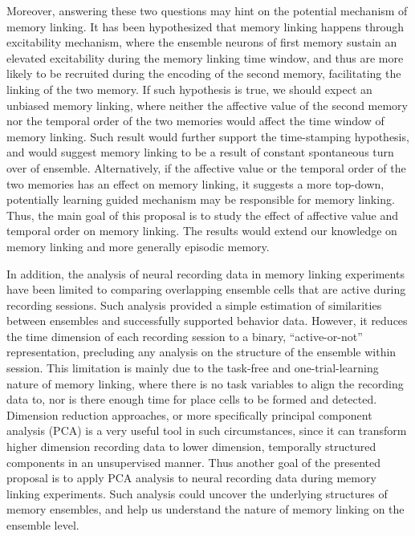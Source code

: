 \documentclass[master.tex]{subfiles}
\begin{document}
Moreover, answering these two questions may hint on the potential mechanism of
memory linking. It has been hypothesized that memory linking happens through
excitability mechanism, where the ensemble neurons of first memory sustain an
elevated excitability during the memory linking time window, and thus are more
likely to be recruited during the encoding of the second memory, facilitating
the linking of the two memory. If such hypothesis is true, we should expect an
unbiased memory linking, where neither the affective value of the second memory
nor the temporal order of the two memories would affect the time window of
memory linking. Such result would further support the time-stamping hypothesis,
and would suggest memory linking to be a result of constant spontaneous turn
over of ensemble. Alternatively, if the affective value or the temporal order of
the two memories has an effect on memory linking, it suggests a more top-down,
potentially learning guided mechanism may be responsible for memory linking.
Thus, the main goal of this proposal is to study the effect of affective value
and temporal order on memory linking. The results would extend our knowledge on
memory linking and more generally episodic memory.

In addition, the analysis of neural recording data in memory linking experiments
have been limited to comparing overlapping ensemble cells that are active during
recording sessions. Such analysis provided a simple estimation of
similarities between ensembles and successfully supported behavior data.
However, it reduces the time dimension of each recording session to a binary,
``active-or-not'' representation, precluding any analysis on the structure of
the ensemble within session. This limitation is mainly due to the task-free and
one-trial-learning nature of memory linking, where there is no task
variables to align the recording data to, nor is there enough time for place
cells to be formed and detected. Dimension reduction approaches, or more
specifically principal component analysis (PCA) is a very useful tool in such
circumstances, since it can transform higher dimension recording data to lower
dimension, temporally structured components in an unsupervised manner. Thus
another goal of the presented proposal is to apply PCA analysis to neural
recording data during memory linking experiments. Such analysis could uncover
the underlying structures of memory ensembles, and help us understand the nature
of memory linking on the ensemble level.
\end{document}
